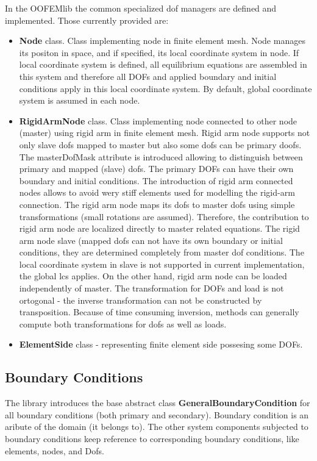 \documentclass[a4paper]{article}
\newcommand{\class}[1]{{\bf #1}}
\newcommand{\attribute}[1]{#1}
\begin{document}
In the OOFEMlib the common specialized dof managers are
defined and implemented. Those currently provided are:
\begin{itemize}
\item
\class{Node} class. Class implementing node in finite element mesh. 
Node manages its positon in space, and if specified, its	
local coordinate system in node. If local coordinate system is defined, all 
equilibrium equations are assembled in this system and therefore all DOFs and
applied  boundary and initial conditions apply in this local coordinate system.
By default, global coordinate system is assumed in each node.
\item
\class{RigidArmNode} class.	
Class implementing node connected to other node (master) using rigid arm in finite element mesh. 
Rigid arm node supports not only slave dofs mapped to master
but also some dofs can be primary doofs. The \attribute{masterDofMask}
attribute is introduced allowing to
distinguish between primary and mapped (slave) dofs. 
The primary DOFs can have their own boundary and initial conditions.
The introduction of rigid arm connected nodes allows to avoid wery stiff elements used
for modelling the rigid-arm connection. The rigid arm node maps its dofs to master dofs
using simple transformations (small rotations are assumed). Therefore, the contribution
to rigid arm node are localized directly to master related equations.
The rigid arm node slave (mapped dofs can not have its own boundary or initial conditions,
they are determined completely from master dof conditions. 
The local coordinate system in slave is not supported in current implementation, the global lcs applies.
On the other hand, rigid arm node can be loaded independently of master.
The transformation for DOFs and load is not ortogonal - the in\-ver\-se tran\-sfor\-ma\-tion can 
not be constructed by transposition. Because of time consuming inversion, methods 
can generally compute both transformations for dofs as well as loads.
\item
\class{ElementSide} class - representing finite element side possesing
some DOFs.
\end{itemize}

\subsection{Boundary Conditions}
The library introduces the base abstract class \class{GeneralBoundaryCondition} for all boundary
conditions (both primary and secondary). 
Boundary condition is an aribute of the domain (it belongs to).
The other system components subjected to boundary conditions keep reference to corresponding boundary
conditions, like elements, nodes, and Dofs.
	
\end{document}
